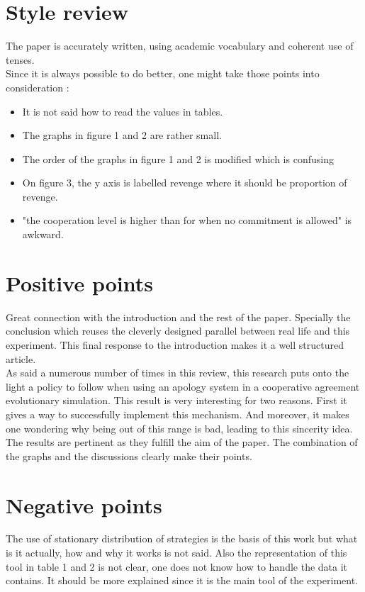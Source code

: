 \documentclass{article}
\begin{document}
\section{Style review}
The paper is accurately written, using academic vocabulary and coherent use of tenses.\\
Since it is always possible to do better, one might take those points into consideration :
\begin{itemize}
\item It is not said how to read the values in tables.
\item The graphs in figure 1 and 2 are rather small.
\item The order of the graphs in figure 1 and 2 is modified which is confusing
\item On figure 3, the y axis is labelled revenge where it should be proportion of revenge. 
\item "the cooperation level is higher than for when no commitment is allowed" is awkward.
\end{itemize}


\section{Positive points}

Great connection with the introduction and the rest of the paper. Specially the conclusion which reuses the cleverly designed parallel between real life and this experiment. This final response to the introduction makes it a well structured article.\\

As said a numerous number of times in this review, this research puts onto the light a policy to follow when using an apology system in a cooperative agreement evolutionary simulation. This result is very interesting for two reasons. First it gives a way to successfully implement this mechanism. And moreover, it makes one wondering why being out of this range is bad, leading to this sincerity idea.\\

The results are pertinent as they fulfill the aim of the paper. The combination of the graphs and the discussions clearly make their points. 

\section{Negative points}

The use of stationary distribution of strategies is the basis of this work but what is it actually, how and why it works is not said. Also the representation of this tool in table 1 and 2 is not clear, one does not know how to handle the data it contains. It should be more explained since it is the main tool of the experiment.\\
\end{document}
